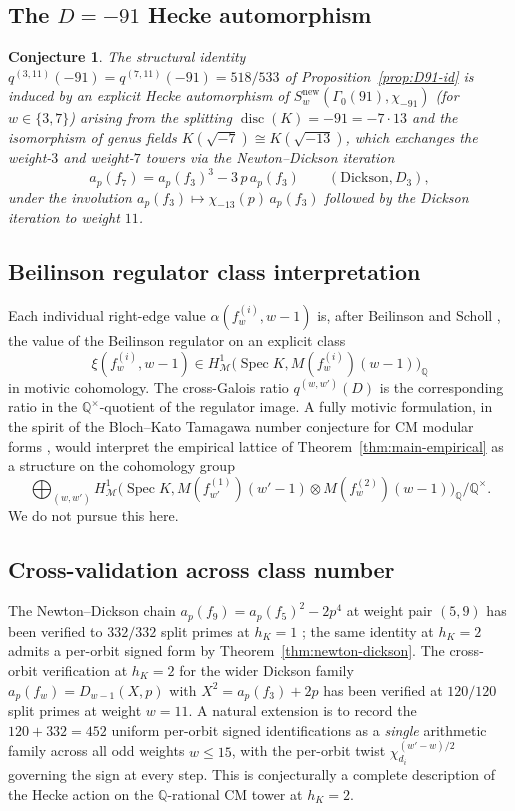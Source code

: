 \documentclass[11pt,a4paper]{amsart}
\theoremstyle{plain}
\newtheorem{conjecture}[theorem]{Conjecture}
\theoremstyle{definition}
\DeclareMathOperator{\disc}{disc}
\DeclareMathOperator{\Spec}{Spec}
\newcommand{\Q}{\mathbb{Q}}
\newcommand{\HM}{H^1_{\mathcal{M}}}
\newcommand{\fl}[2]{f_{#1}^{(#2)}}
\newcommand{\qstr}[2]{q^{(#1,#2)}}
\begin{document}
\subsection{The $D = -91$ Hecke automorphism}\label{ss:open-D91}

\begin{conjecture}\label{conj:D91}
The structural identity
$\qstr{3}{11}(-91) = \qstr{7}{11}(-91) = 518/533$ of
Proposition~\ref{prop:D91-id} is induced by an explicit Hecke automorphism
of $S_w^{\mathrm{new}}(\Gamma_0(91), \chi_{-91})$ (for $w \in \{3, 7\}$)
arising from the splitting $\disc(K) = -91 = -7\cdot 13$ and the
isomorphism of genus fields
$K(\sqrt{-7}) \cong K(\sqrt{-13})$, which exchanges the weight-$3$ and
weight-$7$ towers via the Newton--Dickson iteration
\[
   a_p(f_7) = a_p(f_3)^3 - 3\,p\,a_p(f_3) \qquad (\text{Dickson}, D_3),
\]
under the involution $a_p(f_3)\mapsto \chi_{-13}(p)\,a_p(f_3)$
followed by the Dickson iteration to weight $11$.
\end{conjecture}

\subsection{Beilinson regulator class interpretation}\label{ss:open-Beilinson}

Each individual right-edge value $\alpha(\fl{w}{i}, w-1)$ is, after Beilinson
\cite{Beilinson1985} and Scholl \cite{Scholl1990}, the value of the
Beilinson regulator on an explicit class
\[
   \xi(\fl{w}{i}, w-1) \in \HM\bigl(\Spec K, M(\fl{w}{i})(w-1)\bigr)_\Q
\]
in motivic cohomology. The cross-Galois ratio $\qstr{w}{w'}(D)$ is the
corresponding ratio in the $\Q^{\times}$-quotient of the regulator image.
A fully motivic formulation, in the spirit of the Bloch--Kato Tamagawa
number conjecture for CM modular forms \cite{Castella2025}, would interpret
the empirical lattice of Theorem~\ref{thm:main-empirical} as a structure on
the cohomology group
\[
   \bigoplus_{(w, w')} \HM\bigl(\Spec K, M(\fl{w'}{1})(w'-1)\otimes
   M(\fl{w}{2})(w-1)\bigr)_\Q\Big/\Q^{\times}.
\]
We do not pursue this here.

\subsection{Cross-validation across class number}\label{ss:open-cross}

The Newton--Dickson chain
$a_p(f_9) = a_p(f_5)^2 - 2 p^4$ at weight pair $(5, 9)$ has been verified
to $332/332$ split primes at $h_K = 1$
\cite{Remondiere2026ND}; the same identity at $h_K = 2$ admits a per-orbit
signed form by Theorem~\ref{thm:newton-dickson}. The cross-orbit verification
at $h_K = 2$ for the wider Dickson family
$a_p(f_w) = D_{w-1}(X, p)$ with $X^2 = a_p(f_3) + 2p$
\cite[OP-DICKSON-UNIFIED]{Remondiere2026ND} has been verified at $120/120$
split primes at weight $w = 11$. A natural extension is to record the
$120 + 332 = 452$ uniform per-orbit signed identifications as a
\emph{single} arithmetic family across all odd weights $w \le 15$, with
the per-orbit twist $\chi_{d_i}^{(w'-w)/2}$ governing the sign at every
step. This is conjecturally a complete description of the Hecke action on
the $\Q$-rational CM tower at $h_K = 2$.
\end{document}

